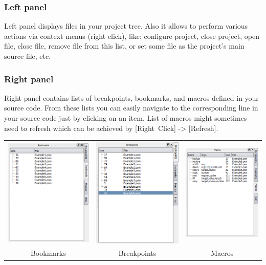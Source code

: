         \subsubsection{Left panel}
            Left panel displays files in your project tree. Also it allows to perform various actions via context menus (right click), like: configure project, close project, open file, close file, remove file from this list, or set some file as the project's main source file, etc.

        \subsubsection{Right panel}
            Right panel contains lists of breakpoints, bookmarks, and macros defined in your source code. From these lists you can easily navigate to the corresponding line in your source code just by clicking on an item. List of macros might sometimes need to refresh which can be achieved by [Right~Click] -> [Refresh].

            \begin{table}[h!]
                \begin{tabular}{ccc}
                    \includegraphics[width=.3\textwidth]{img/listbookmarks.png}
                        &
                    \includegraphics[width=.3\textwidth]{img/listbreakpoints.png}
                        &
                    \includegraphics[width=.3\textwidth]{img/listmacros.png}
                    \\ Bookmarks & Breakpoints & Macros
                \end{tabular}
            \end{table}


